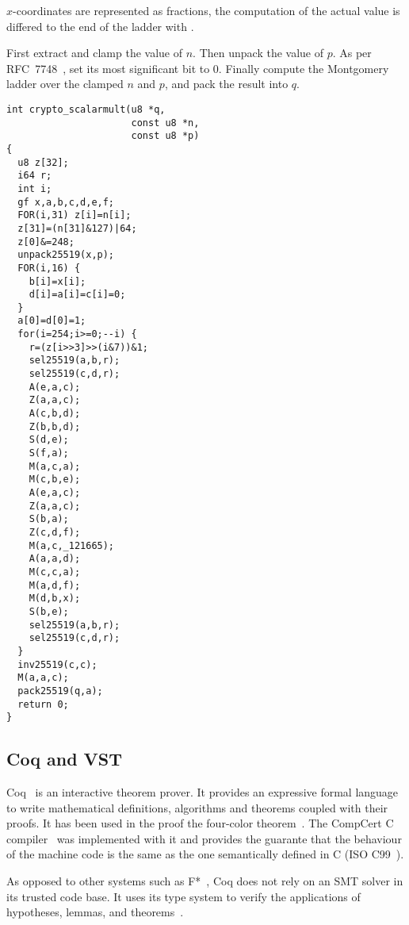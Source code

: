 $x$-coordinates are represented as fractions, the computation of the actual
value is differed to the end of the ladder with .

First extract and clamp the value of $n$. Then unpack the value of $p$.
As per RFC~7748~\cite{rfc7748}, set its most significant bit to 0.
Finally compute the Montgomery ladder over the clamped $n$ and $p$,
and pack the result into $q$.
\begin{lstlisting}[language=Ctweetnacl]
int crypto_scalarmult(u8 *q,
                      const u8 *n,
                      const u8 *p)
{
  u8 z[32];
  i64 r;
  int i;
  gf x,a,b,c,d,e,f;
  FOR(i,31) z[i]=n[i];
  z[31]=(n[31]&127)|64;
  z[0]&=248;
  unpack25519(x,p);
  FOR(i,16) {
    b[i]=x[i];
    d[i]=a[i]=c[i]=0;
  }
  a[0]=d[0]=1;
  for(i=254;i>=0;--i) {
    r=(z[i>>3]>>(i&7))&1;
    sel25519(a,b,r);
    sel25519(c,d,r);
    A(e,a,c);
    Z(a,a,c);
    A(c,b,d);
    Z(b,b,d);
    S(d,e);
    S(f,a);
    M(a,c,a);
    M(c,b,e);
    A(e,a,c);
    Z(a,a,c);
    S(b,a);
    Z(c,d,f);
    M(a,c,_121665);
    A(a,a,d);
    M(c,c,a);
    M(a,d,f);
    M(d,b,x);
    S(b,e);
    sel25519(a,b,r);
    sel25519(c,d,r);
  }
  inv25519(c,c);
  M(a,a,c);
  pack25519(q,a);
  return 0;
}
\end{lstlisting}

\subsection{Coq and VST}
\label{preliminaries:C}

Coq~\cite{coq-faq} is an interactive theorem prover. It provides an expressive
formal language to write mathematical definitions, algorithms and theorems coupled
with their proofs. It has been used in the proof the four-color theorem~\cite{gonthier2008formal}.
The CompCert C compiler~\cite{Leroy-backend} was implemented with it and provides
the guarante that the behaviour of the machine code is the same as the one
semantically defined in C (ISO C99~\cite{ISO:C99}).

As opposed to other systems such as F*~\cite{DBLP:journals/corr/BhargavanDFHPRR17},
Coq does not rely on an SMT solver in its trusted code base.
It uses its type system to verify the applications of hypotheses,
lemmas, and theorems~\cite{Howard1995-HOWTFN}.

